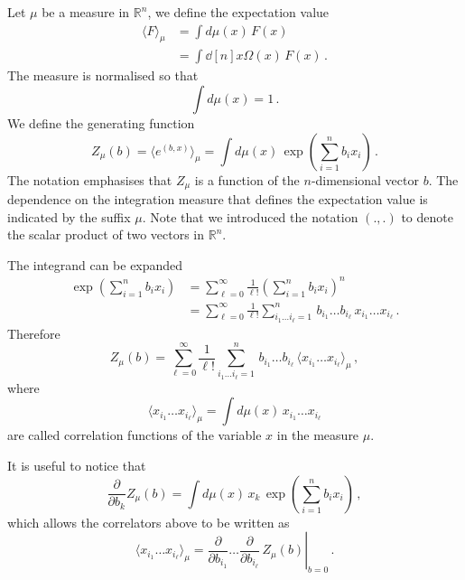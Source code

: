 \documentclass[notes.tex]{subfiles}
\begin{document}
Let $\mu$ be a measure in $\mathbb{R}^n$, we define the expectation value 
\begin{align}
  \label{eq:ExpValMu}
  \langle F \rangle_\mu &= \int d\mu(x)\, F(x) \\
  &= \int \dd[n]{x} \Omega(x)\, F(x)\, .
\end{align}
The measure is normalised so that
\begin{equation}
  \label{eq:MeasureNorm}
  \int d\mu(x) = 1\, .
\end{equation}
We define the generating function
\begin{equation}
  \label{eq:ZGenFunc}
  Z_\mu(b) = \langle e^{(b,x)}\rangle_\mu = 
  \int d\mu(x)\, \exp\left(
    \sum_{i=1}^n b_i x_i
  \right)\, .
\end{equation}
The notation emphasises that $Z_\mu$ is a function of the $n$-dimensional vector $b$. The dependence on the integration measure that defines the expectation value is indicated by the suffix $\mu$. Note that we introduced the notation $(.,.)$ to denote the scalar product of two vectors in $\mathbb{R}^n$.

The integrand can be expanded
\begin{align}
  \exp\left(
    \sum_{i=1}^n b_i x_i
  \right) &= 
            \sum_{\ell=0}^\infty \frac{1}{\ell!} \left(
    \sum_{i=1}^n b_i x_i
  \right)^n \\
  &= \sum_{\ell=0}^\infty \frac{1}{\ell!}
    \sum_{i_1 \ldots i_\ell=1}^n \, b_{i_1} \ldots b_{i_\ell}\,
    x_{i_1} \ldots x_{i_\ell}\, .
\end{align}
Therefore
\begin{equation}
  \label{eq:ZExp}
  Z_\mu(b) =  \sum_{\ell=0}^\infty \frac{1}{\ell!}
    \sum_{i_1 \ldots i_\ell=1}^n \, b_{i_1} \ldots b_{i_\ell}\,
    \langle x_{i_1} \ldots x_{i_\ell}\rangle_\mu\, ,
\end{equation}
where
\begin{equation}
  \label{eq:XCorrel}
   \langle x_{i_1} \ldots x_{i_\ell}\rangle_\mu = 
   \int d\mu(x)\, x_{i_1} \ldots x_{i_\ell}
\end{equation}
are called correlation functions of the variable $x$ in the measure $\mu$.

It is useful to notice that 
\begin{equation}
  \label{eq:DiffGenFunct}
  \frac{\partial}{\partial b_k} Z_\mu(b) = \int d\mu(x)\, x_k\, \exp\left(
    \sum_{i=1}^n b_i x_i
  \right)\, ,
\end{equation}
which allows the correlators above to be written as
\begin{equation}
  \label{eq:DiffGenFunctCorr}
  \langle x_{i_1} \ldots x_{i_\ell}\rangle_\mu = \left.
  \frac{\partial}{\partial b_{i_1}} \ldots \frac{\partial}{\partial b_{i_\ell}}\,
  Z_\mu(b) \right|_{b=0}\, .
\end{equation}
\end{document}
